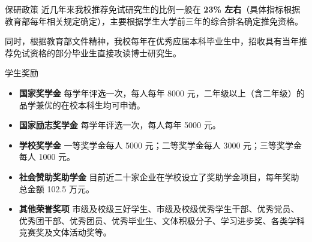 \documentclass[aspectratio=169, utf8, fontset=windows]{beamer}
\begin{document}
\begin{frame}{保研政策}
    近几年来我校推荐免试研究生的比例一般在 \textcolor{Fore}{\textbf{23\% 左右}}（具体指标根据教育部每年相关规定确定），主要根据学生大学前三年的综合排名确定推免资格。

    同时，根据教育部文件精神，我校每年在优秀应届本科毕业生中，招收具有当年推荐免试资格的部分毕业生直接攻读博士研究生。
\end{frame}

\begin{frame}{学生奖励}
    \small
    \begin{itemize}
        \item \textcolor{Fore}{\textbf{国家奖学金}}
              每学年评选一次，每人每年 8000 元，二年级以上（含二年级）的品学兼优的在校本科生均可申请。
        \item \textcolor{Fore}{\textbf{国家励志奖学金}}
              每学年评选一次，每人每年 5000 元。
        \item \textcolor{Fore}{\textbf{学校奖学金}}
              一等奖学金每人 5000 元；二等奖学金每人 3000 元；三等奖学金每人 1000 元。
        \item \textcolor{Fore}{\textbf{社会赞助奖助学金}}
              目前近二十家企业在学校设立了奖助学金项目，每年奖助总金额 102.5 万元。
        \item \textcolor{Fore}{\textbf{其他荣誉奖项}}
              市级及校级三好学生、市级及校级优秀学生干部、优秀党员、优秀团干部、优秀团员、优秀毕业生、文体积极分子、学习进步奖、各类学科竞赛奖及文体活动奖等。
    \end{itemize}
\end{frame}
\end{document}
